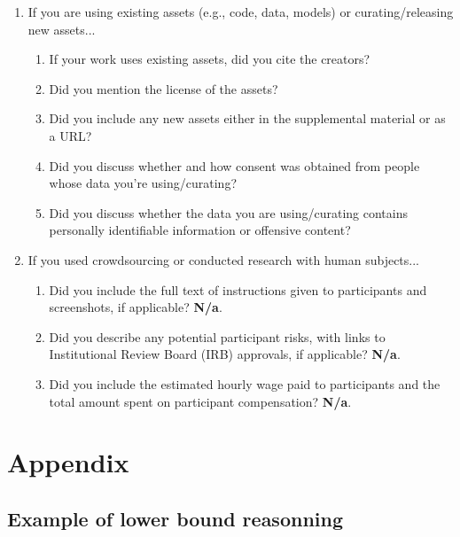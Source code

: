\documentclass{article}
\begin{document}
\begin{enumerate}
\item If you are using existing assets (e.g., code, data, models) or curating/releasing new assets...
\begin{enumerate}
  \item If your work uses existing assets, did you cite the creators?
    \answerTODO{}
  \item Did you mention the license of the assets?
    \answerTODO{}
  \item Did you include any new assets either in the supplemental material or as a URL?
    \answerTODO{}
  \item Did you discuss whether and how consent was obtained from people whose data you're using/curating?
    \answerTODO{}
  \item Did you discuss whether the data you are using/curating contains personally identifiable information or offensive content?
    \answerTODO{}
\end{enumerate}

\item If you used crowdsourcing or conducted research with human subjects...
\begin{enumerate}
  \item Did you include the full text of instructions given to participants and screenshots, if applicable?
		\textbf{N/a}.
  \item Did you describe any potential participant risks, with links to Institutional Review Board (IRB) approvals, if applicable?
		\textbf{N/a}.
  \item Did you include the estimated hourly wage paid to participants and the total amount spent on participant compensation?
		\textbf{N/a}.
\end{enumerate}

\end{enumerate}


\appendix

\section{Appendix}


\subsection{Example of lower bound reasonning}
\end{document}
